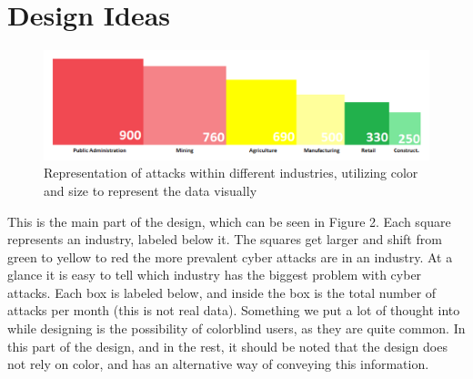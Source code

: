 \documentclass[journal]{vgtc}                %
\begin{document}
\section{Design Ideas}
\begin{figure}[tb]
 \centering %
 \includegraphics[width=\columnwidth]{Design1}
 \caption{Representation of attacks within different industries, utilizing color and size to represent the data visually}
 \label{fig:sample}
\end{figure}

This is the main part of the design, which can be seen in Figure 2. 
Each square represents an industry, labeled below it. 
The squares get larger and shift from green to yellow to red the more prevalent cyber attacks are in an industry. 
At a glance it is easy to tell which industry has the biggest problem with cyber attacks. 
Each box is labeled below, and inside the box is the total number of attacks per month (this is not real data). 
Something we put a lot of thought into while designing is the possibility of colorblind users, as they are quite common. 
In this part of the design, and in the rest, it should be noted that the design does not rely on color, and has an alternative way of conveying this information.
\end{document}
